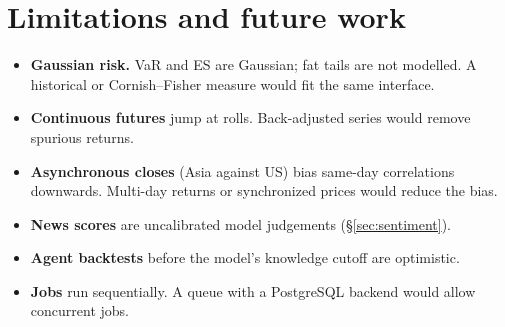 \documentclass[11pt,a4paper]{article}
\begin{document}
\section{Limitations and future work}\label{sec:limitations}
\begin{itemize}
  \item \textbf{Gaussian risk.} VaR and ES are Gaussian; fat tails are not modelled. A
        historical or Cornish--Fisher measure would fit the same interface.
  \item \textbf{Continuous futures} jump at rolls. Back-adjusted series would remove
        spurious returns.
  \item \textbf{Asynchronous closes} (Asia against US) bias same-day correlations downwards.
        Multi-day returns or synchronized prices would reduce the bias.
  \item \textbf{News scores} are uncalibrated model judgements (\S\ref{sec:sentiment}).
  \item \textbf{Agent backtests} before the model's knowledge cutoff are optimistic.
  \item \textbf{Jobs} run sequentially. A queue with a PostgreSQL backend would allow
        concurrent jobs.
\end{itemize}
\end{document}
